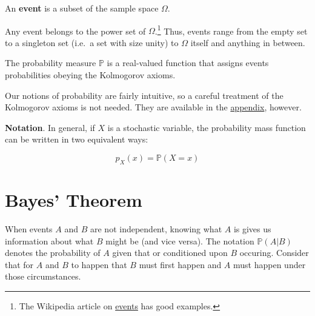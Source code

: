 \documentclass[13pt,oneside]{tufte-book}
\theoremstyle{definition}
\theoremstyle{definition}
\theoremstyle{definition}
\theoremstyle{remark}
\let\BeginKnitrBlock\begin \let\EndKnitrBlock\end
\begin{document}
\BeginKnitrBlock{definition}[Event]
\protect\hypertarget{def:unnamed-chunk-8}{}{\label{def:unnamed-chunk-8}
{} } An \textbf{event} is a subset of the sample
space \(\Omega\).
\EndKnitrBlock{definition}

\BeginKnitrBlock{remark}
{} Any event belongs to the power set of
\(\Omega\).\footnote{The Wikipedia article on
  \href{https://en.wikipedia.org/wiki/Event_(probability_theory)\#A_simple_example}{events}
  has good examples.} Thus, events range from the empty set to a
singleton set (i.e.~a set with size unity) to \(\Omega\) itself and
anything in between.
\EndKnitrBlock{remark}

\begin{marginfigure}
\end{marginfigure}

\BeginKnitrBlock{definition}[Probability Measure]
\protect\hypertarget{def:unnamed-chunk-11}{}{\label{def:unnamed-chunk-11}
{} } The probability measure
\(\mathbb{P}\) is a real-valued function that assigns events
probabilities obeying the Kolmogorov axioms.
\EndKnitrBlock{definition}

Our notions of probability are fairly intuitive, so a careful treatment
of the Kolmogorov axioms is not needed. They are available in the
\protect\hyperlink{kmaxm}{appendix}, however.

\begin{marginfigure}
\textbf{Notation}. In general, if \(X\) is a stochastic variable, the
probability mass function can be written in two equivalent ways:

\begin{equation}
p_X(x) = \mathbb{P}(X=x)
\label{eq:prob-notation}
\end{equation}
\end{marginfigure}

\section{Bayes' Theorem}\label{bayes-theorem}

When events \(A\) and \(B\) are not independent, knowing what \(A\) is
gives us information about what \(B\) might be (and vice versa). The
notation \(\mathbb{P}(A|B)\) denotes the probability of \(A\) given that
or conditioned upon \(B\) occuring. Consider that for \(A\) and \(B\) to
happen that \(B\) must first happen and \(A\) must happen under those
circumstances.
\end{document}
